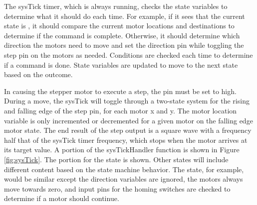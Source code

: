 \documentclass[11pt]{LaTeX-Classes/math-hw}
\begin{document}
The sysTick timer, which is always running, checks the state variables to determine what it should
do each time. For example, if it sees that the current state is , it should compare the current
motor locations and destinations to determine if the command is complete. Otherwise, it should
determine which direction the motors need to move and set the direction pin while toggling
the step pin on the motors as needed.
Conditions are checked each time to determine if a command is done.
State variables are updated to move to the next state based on the outcome.

In causing the stepper motor to execute a step, the  pin must be set to high.
During a move, the sysTick will toggle through a two-state system for the rising and falling
edge of the step pin, for each motor x and y. The motor location variable
is only incremented or decremented
for a given motor on the falling edge motor state.
The end result of the step output is a square wave with a frequency half that
of the sysTick timer frequency, which stops when the motor arrives at its target value.
A portion of the sysTickHandler function is shown in Figure \ref{fig:sysTick}.
The portion for the  state is shown. Other states will include different content
based on the state machine behavior. The  state, for example, would be similar
except the direction variables are ignored, the motors always move towards zero, and input
pins for the homing switches are checked to determine if a motor should continue.
\end{document}
